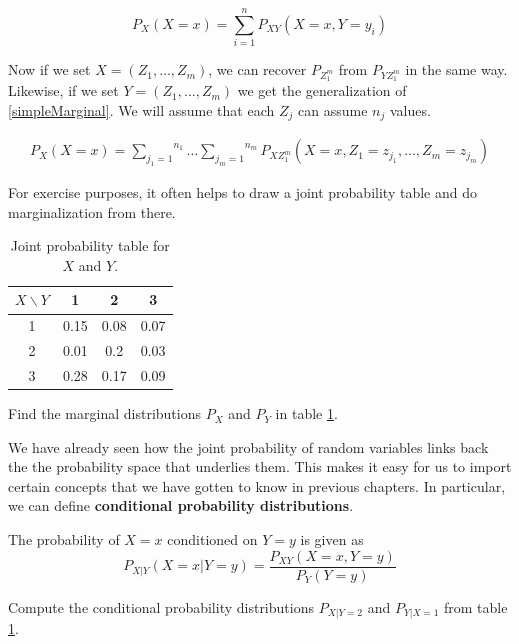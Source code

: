 \documentclass[a4paper,11pt,leqno]{report}
\begin{document}
\begin{Definition}
\begin{equation} \label{simpleMarginal}
P_{X}(X=x) = \overset{n}{\underset{i=1}{\sum}} P_{XY}(X=x,Y=y_{i}) 
\end{equation}

Now if we set $ X = (Z_{1}, \ldots, Z_{m}) $, we can recover $ P_{Z_{1}^{m}} $ from $ P_{YZ_{1}^{m}} $ in the same way. Likewise,
if we set $ Y = (Z_{1}, \ldots, Z_{m}) $ we get the generalization of \ref{simpleMarginal}. We will assume that each $ Z_{j} $
can assume $ n_{j} $ values.

\begin{align}
P_{X}(X=x) = \overset{n_{1}}{\underset{j_{1}=1}{\sum}}\ldots \overset{n_{m}}{\underset{j_{m}=1}{\sum}} 
P_{XZ_{1}^{m}}(X=x,Z_{1}=z_{j_{1}}, \ldots, Z_{m}=z_{j_{m}})
\end{align}

For exercise purposes, it often helps to draw a joint probability table and do marginalization from there.

\begin{table}
\center
\begin{tabular}{|c|c|c|c|}
\hline
$X\backslash Y$	& 1		& 2		& 3		\\
\hline
1				& 0.15	& 0.08	& 0.07	\\
2				& 0.01	& 0.2	& 0.03	\\	
3				& 0.28	& 0.17	& 0.09	\\
\hline
\end{tabular}
\caption{Joint probability table for $ X $ and $ Y $.}
\label{jointTable}
\end{table}

\begin{Exercise}
Find the marginal distributions $ P_{X} $ and $ P_{Y} $ in table \ref{jointTable}.
\end{Exercise}

We have already seen how the joint probability of random variables links back the the probability space that underlies them.
This makes it easy for us to import certain concepts that we have gotten to know in previous chapters. In particular, we can
define \textbf{conditional probability distributions}.

\begin{Definition}
The probability of $ X = x $ conditioned on $ Y=y $ is given as
$$ P_{X|Y}(X=x|Y=y) = \dfrac{P_{XY}(X=x, Y=y)}{P_{Y}(Y=y)} $$
\end{Definition} 

\begin{Exercise}
Compute the conditional probability distributions $ P_{X|Y=2} $ and $ P_{Y|X=1} $ from table \ref{jointTable}.
\end{Exercise}


\end{Definition}
\end{document}
